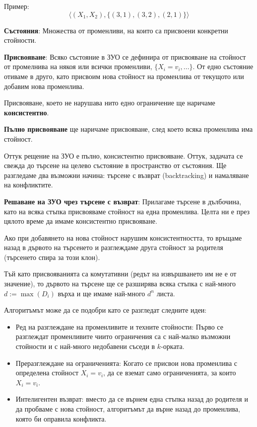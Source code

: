 \documentclass{article}
\renewcommand{\\}{\newline}
\begin{document}
Пример: \[
  \langle (X_1, X_2), \{(3,1), (3,2), (2,1)\}\rangle
\] 

\textbf{Състояния}: Множества от променливи, на които са присвоени конкретни стойности.

\textbf{Присвояване}: Всяко състояние в ЗУО се дефинира от присвояване на стойност от промелнива на някоя или всички променливи, \(\{X_i = v_i, ...\}\). От едно състояние отиваме в друго, като присвоим нова стойност на променлива от текущото или добавим нова променлива.

Присвояване, което не нарушава нито едно ограничение ще наричаме \textbf{консистентно}.

\textbf{Пълно присвояване} ще наричаме присвояване, след което всяка променлива има стойност.

Оттук рещение на ЗУО е пълно, консистентно присвояване. Оттук, задачата се свежда до търсене на целево състояние в пространство от състояния. Ще разгледаме два възможни начина: търсене с възврат (backtracking) и намаляване на конфликтите.

\textbf{Решаване на ЗУО чрез търсене с възврат}: Прилагаме търсене в дълбочина, като на всяка стъпка присвояваме стойност на една променлива. Целта ни е през цялото време да имаме консистентно присвояване. 

Ако при добавянето на нова стойност нарушим консистентността, то връщаме назад в дървото на търсенето и разглеждаме друга стойност за родителя (търсенето спира за този клон). 

Тъй като присвояванията са комутативни (редът на извършването им не е от значение), то дървото на търсене ще се разширява всяка стъпка с най-много \(d:=\max(D_i)\) върха и ще имаме най-много \(d^{n}\) листа. 

Алгоритъмът може да се подобри като се разгледат следните идеи:
\begin{itemize}
    \item Ред на разглеждане на променливите и техните стойности: Първо се разглеждат променливите чиито ограничения са с най-малко възможни стойности и с най-много недобавени съседи в \(k\)-орката.
    \item Преразглеждане на ограниченията: Когато се присвои нова променлива с определена стойност \(X_i = v_i\), да се вземат само ограниченията, за които \(X_i = v_i\). 
    \item Интелигентен възврат: вместо да се върнем една стъпка назад до родителя и да пробваме с нова стойност, алгоритъмът да върне назад до променлива, която би оправила конфликта.
\end{itemize}
\end{document}
